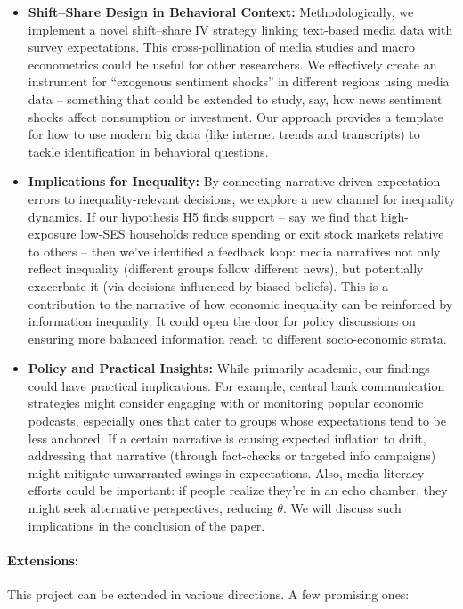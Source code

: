 \documentclass[12pt]{article}
\begin{document}
\begin{itemize}
    \item \textbf{Shift–Share Design in Behavioral Context:} Methodologically, we implement a novel shift–share IV strategy linking text-based media data with survey expectations. This cross-pollination of media studies and macro econometrics could be useful for other researchers. We effectively create an instrument for “exogenous sentiment shocks” in different regions using media data – something that could be extended to study, say, how news sentiment shocks affect consumption or investment. Our approach provides a template for how to use modern big data (like internet trends and transcripts) to tackle identification in behavioral questions.

    \item \textbf{Implications for Inequality:} By connecting narrative-driven expectation errors to inequality-relevant decisions, we explore a new channel for inequality dynamics. If our hypothesis H5 finds support – say we find that high-exposure low-SES households reduce spending or exit stock markets relative to others – then we've identified a feedback loop: media narratives not only reflect inequality (different groups follow different news), but potentially exacerbate it (via decisions influenced by biased beliefs). This is a contribution to the narrative of how economic inequality can be reinforced by information inequality. It could open the door for policy discussions on ensuring more balanced information reach to different socio-economic strata.

    \item \textbf{Policy and Practical Insights:} While primarily academic, our findings could have practical implications. For example, central bank communication strategies might consider engaging with or monitoring popular economic podcasts, especially ones that cater to groups whose expectations tend to be less anchored. If a certain narrative is causing expected inflation to drift, addressing that narrative (through fact-checks or targeted info campaigns) might mitigate unwarranted swings in expectations. Also, media literacy efforts could be important: if people realize they're in an echo chamber, they might seek alternative perspectives, reducing $\theta$. We will discuss such implications in the conclusion of the paper.
\end{itemize}

\paragraph{Extensions:} This project can be extended in various directions. A few promising ones:
\end{document}
